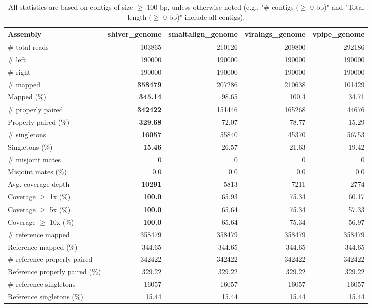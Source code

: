 \documentclass[12pt,a4paper]{article}
\begin{document}
\begin{table}[ht]
\begin{center}
\caption{All statistics are based on contigs of size $\geq$ 100 bp, unless otherwise noted (e.g., "\# contigs ($\geq$ 0 bp)" and "Total length ($\geq$ 0 bp)" include all contigs).}
\begin{tabular}{|l*{4}{|r}|}
\hline
Assembly & shiver\_genome & smaltalign\_genome & viralngs\_genome & vpipe\_genome \\ \hline
\# total reads & 103865 & 210126 & 209800 & 292186 \\ \hline
\# left & 190000 & 190000 & 190000 & 190000 \\ \hline
\# right & 190000 & 190000 & 190000 & 190000 \\ \hline
\# mapped & {\bf 358479} & 207286 & 210638 & 101429 \\ \hline
Mapped (\%) & {\bf 345.14} & 98.65 & 100.4 & 34.71 \\ \hline
\# properly paired & {\bf 342422} & 151446 & 165268 & 44676 \\ \hline
Properly paired (\%) & {\bf 329.68} & 72.07 & 78.77 & 15.29 \\ \hline
\# singletons & {\bf 16057} & 55840 & 45370 & 56753 \\ \hline
Singletons (\%) & {\bf 15.46} & 26.57 & 21.63 & 19.42 \\ \hline
\# misjoint mates & 0 & 0 & 0 & 0 \\ \hline
Misjoint mates (\%) & 0.0 & 0.0 & 0.0 & 0.0 \\ \hline
Avg. coverage depth & {\bf 10291} & 5813 & 7211 & 2774 \\ \hline
Coverage $\geq$ 1x (\%) & {\bf 100.0} & 65.93 & 75.34 & 60.17 \\ \hline
Coverage $\geq$ 5x (\%) & {\bf 100.0} & 65.64 & 75.34 & 57.33 \\ \hline
Coverage $\geq$ 10x (\%) & {\bf 100.0} & 65.64 & 75.34 & 56.97 \\ \hline
\# reference mapped & 358479 & 358479 & 358479 & 358479 \\ \hline
Reference mapped (\%) & 344.65 & 344.65 & 344.65 & 344.65 \\ \hline
\# reference properly paired & 342422 & 342422 & 342422 & 342422 \\ \hline
Reference properly paired (\%) & 329.22 & 329.22 & 329.22 & 329.22 \\ \hline
\# reference singletons & 16057 & 16057 & 16057 & 16057 \\ \hline
Reference singletons (\%) & 15.44 & 15.44 & 15.44 & 15.44 \\ \hline

\end{tabular}
\end{center}
\end{table}
\end{document}
